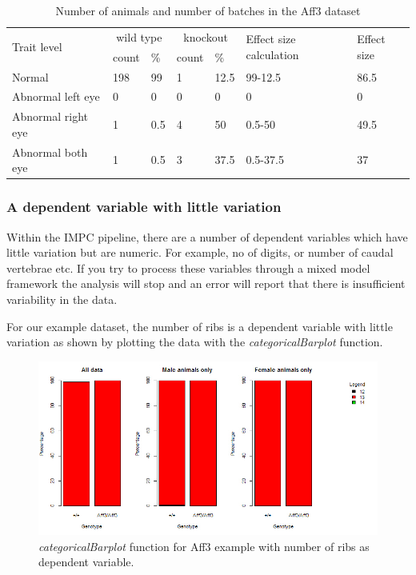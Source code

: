 \documentclass[12pt,a4paper]{article}
\begin{document}
\begin{table}[!h]
\begin{center}
\begin{tabular}{| l | l | l | l | l | l | l| }
  \hline
\multirow{2}{*}{Trait level}&\multicolumn{2}{c}{wild type}&\multicolumn{2}{c}{knockout}&\multirow{2}{*}{Effect size calculation}&\multirow{2}{*}{Effect size}\\
		     &count& \%			    &count& \%                   &                                        &\\\hline 
Normal &198& 99			    &1& 12.5                   &          99-12.5                              &86.5\\ 
Abnormal left eye&0& 0			    &0& 0                   &          0                              &0\\ 
Abnormal right eye&1& 0.5			    &4& 50                   &          0.5-50                             &49.5\\ 
Abnormal both eye&1& 0.5			    &3& 37.5                   &          0.5-37.5                             &37\\ 
\hline  
\end{tabular}
\caption{Number of animals and number of batches in the Aff3 dataset}\label{table:06}
\end{center}
\end{table}

\subsubsection{A dependent variable with little variation}

Within the IMPC pipeline, there are a number of dependent variables which have little variation but are numeric. 
For example, no of digits, or number of caudal vertebrae etc.  
If you try to process these variables through a mixed model framework the analysis will stop and an error will report that there is insufficient variability in the data. 

For our example dataset, the number of ribs is a dependent variable with little variation as shown by plotting the data with the \textit{categoricalBarplot} function.

\begin{figure}[H]%
\centerline{\includegraphics[scale=0.5]{cs2_noRibsRight_percentageplot.jpg}}
\caption{\textit{categoricalBarplot} function for Aff3 example with number of ribs as dependent variable.}\label{fig:24}
\end{figure}
\end{document}
